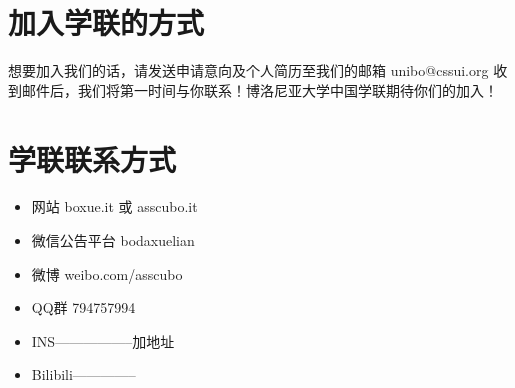 \section{加入学联的方式}
想要加入我们的话，请发送申请意向及个人简历至我们的邮箱 unibo@cssui.org 收到邮件后，我们将第一时间与你联系！博洛尼亚大学中国学联期待你们的加入！

\section{学联联系方式}
\begin{itemize}
\item 网站 boxue.it 或 asscubo.it\\
\item 微信公告平台 bodaxuelian
\item 微博 weibo.com/asscubo
\item QQ群 794757994
\item INS-----------------加地址
\item Bilibili--------------
\end{itemize}


